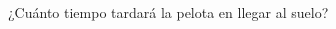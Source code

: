 ¿Cuánto tiempo tardará la pelota en llegar al suelo?


\begin{solutionbox}{1.5cm}

\end{solutionbox}
